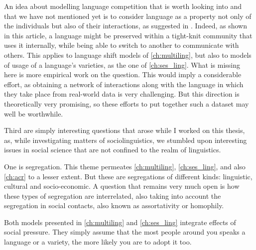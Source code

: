 \documentclass[../thesis.tex]{subfiles}
\begin{document}
An idea about modelling language competition that is worth looking into and that we have
not mentioned yet is to consider language as a property not only of the individuals but
also of their interactions, as suggested in \cite{CarroCoupledDynamics2016}. Indeed, as
shown in this article, a language might be preserved within a tight-knit community that
uses it internally, while being able to switch to another to communicate with others.
This applies to language shift models of \cref{ch:multiling}, but also to models of
usage of a language's varieties, as the one of \cref{ch:ses_ling}. What is missing here
is more empirical work on the question. This would imply a considerable effort, as
obtaining a network of interactions along with the language in which they take place
from real-world data is very challenging. But this direction is theoretically very
promising, so these efforts to put together such a dataset may well be worthwhile.


Third are simply interesting questions that arose while I worked on this thesis, as, while investigating matters of sociolinguistics, we stumbled upon interesting
issues in social science that are not confined to the realm of linguistics.

One is segregation. This theme permeates \cref{ch:multiling},
\cref{ch:ses_ling}, and also \cref{ch:acr} to a lesser extent. But these are
segregations of different kinds: linguistic, cultural and socio-economic. A question
that remains very much open is how these types of segregation are interrelated, also
taking into account the segregation in social contacts, also known as assortativity or
homophily.

Both models presented in \cref{ch:multiling} and \cref{ch:ses_ling} integrate effects of social pressure. They simply assume that the most people around you speaks a language or a variety, the more likely you are to adopt it too.
\end{document}
